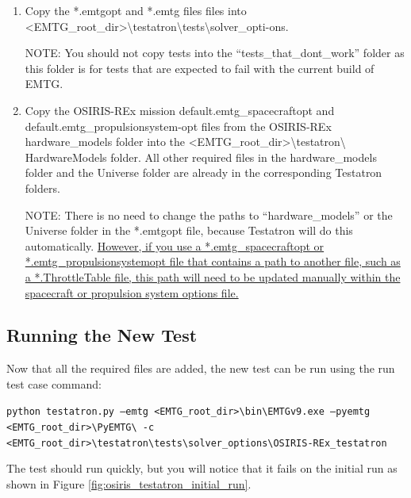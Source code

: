 \documentclass[11pt]{article}
\makeatletter
\newcommand{\knownissuelabel}[2]
{
	 \phantomsection
  	\hyperref[#2_h]{#1}\def\@currentlabel{\unexpanded{#1}}\label{#2_b}
}
\makeatother
\begin{document}
\begin{enumerate}
	\item Copy the *.emtgopt and *.emtg files files into \textless EMTG\_root\_dir\textgreater\textbackslash testatron\textbackslash tests\textbackslash solver\_opti-\newline\indent ons.

NOTE: You should not copy tests into the ``tests\_that\_dont\_work'' folder as this folder is for tests that are expected to fail with the current build of \ac{EMTG}.

	\item Copy the OSIRIS-REx mission default.emtg\_spacecraftopt and default.emtg\_propulsionsystem-\indent opt files from the OSIRIS-REx hardware\_models folder into the \textless EMTG\_root\_dir\textgreater\textbackslash testatron\textbackslash{} HardwareModels folder. All other required files in the hardware\_models folder and the Universe folder are already in the corresponding Testatron folders.

NOTE: There is no need to change the paths to ``hardware\_models'' or the Universe folder in the *.emtgopt file, because Testatron will do this automatically.\knownissuelabel{However, if you use a *.emtg\_spacecraftopt or *.emtg\_propulsionsystemopt file that contains a path to another file, such as a *.ThrottleTable file, this path will need to be updated manually within the spacecraft or propulsion system options file.}{hardware_options_file_paths_issue}

\end{enumerate}

\subsection{Running the New Test}
\label{sec:running_the_new_test}

Now that all the required files are added, the new test can be run using the run test case command:

\texttt{python testatron.py --emtg <EMTG\_root\_dir>\textbackslash bin\textbackslash EMTGv9.exe --pyemtg <EMTG\_root\_\newline\indent dir>\textbackslash PyEMTG\textbackslash{} -c <EMTG\_root\_dir>\textbackslash testatron\textbackslash tests\textbackslash solver\_options\textbackslash OSIRIS-REx\_test\newline\indent atron}

\noindent The test should run quickly, but you will notice that it fails on the initial run as shown in Figure \ref{fig:osiris_testatron_initial_run}.
\end{document}

